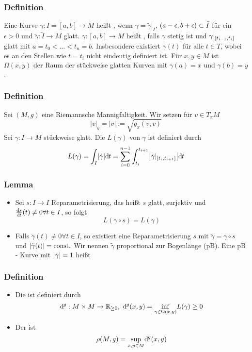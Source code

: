 \subsubsection{Definition}
\label{ssub:225}
Eine Kurve $\gamma:I=[a,b] \to M$ heißt , wenn $\gamma = \tilde{\gamma}\vert_I$, $(a-\epsilon,b+\epsilon) \subset \tilde{I}$ für ein $\epsilon > 0$ und $\tilde{\gamma}:\tilde{I}\to M$ glatt. $\gamma:[a,b] \to M$ heißt , falls $\gamma$ stetig ist und $\gamma\vert_{[t_{i-1},t_i]}$ glatt mit $a=t_0 < \ldots < t_n = b$. Insbesondere existiert $\dot{\gamma}(t)$ für alle $t\in T$, wobei es an den Stellen wie $t = t_i$ nicht eindeutig definiert ist. Für $x,y \in M$ ist $\Omega(x,y)$ der Raum der stückweise glatten Kurven mit $\gamma(a) = x$ und $\gamma(b) = y$.

\subsubsection[Definition: Länge einer stückweisen glatten Kurve]{Definition}
\label{ssub:226}
Sei $(M,g)$ eine Riemannsche Mannigfaltigkeit. Wir setzen für $v\in T_x M$
\[
|v|_g = |v| := \sqrt{g_x(v,v)}
\]
Sei $\gamma:I\to M$ stückweise glatt. Die  $L(\gamma)$ von $\gamma$ ist definiert durch
\[
L(\gamma) = \int_I \abs*{\dot{\gamma}} \mathd t = \sum_{i=0}^{n-1} \int_{t_i}^{t_{i+1}} \abs*{\dot{\gamma}\vert_{\benbrace{t_i,t_{i+1}}}} \mathd t
\]

\subsubsection{Lemma}
\label{ssub:227}
\begin{itemize}[(i)]
\item Sei $s:I\to I$ Reparametrisierung, das heißt $s$ glatt, surjektiv und $\frac{\mathrm{d}\mkern-1.0mu s}{\mathrm{d}\mkern-1.0mu t} (t) \neq 0 \forall t\in I$, so folgt
\[
L(\gamma \circ s) = L(\gamma)
\] 
\item Falls $\dot{\gamma}(t) \neq 0 \forall t\in I$, so existiert eine Reparametrisierung $s$ mit $\tilde{\gamma} = \gamma \circ s$ und $\lvert\tilde{\gamma}(t)\rvert = \text{const.}$ Wir nennen $\tilde{\gamma}$ proportional zur Bogenlänge (pB). Eine pB - Kurve mit $\lvert\dot{\gamma}\rvert = 1$ heißt 
\end{itemize}

\subsubsection{Definition}
\label{ssub:228}
\begin{itemize}
\item Die  ist definiert durch 
\[
\mathrm{d}\mkern-1.0mu^g : M\times M \to \mathbb{R}_{\geq 0},\ \mathrm{d}\mkern-1.0mu^g (x,y) = \underset{\gamma \in \Omega(x,y)}{\inf} L(\gamma) \geq 0
\]
\item Der  ist 
\[
\rho(M,g) = \underset{x,y \in M}{\sup} \mathrm{d}\mkern-1.0mu^g (x,y)
\]
\end{itemize}

